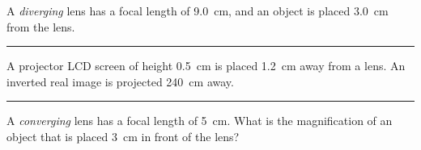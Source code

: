 \documentclass[12pt]{exam}
\begin{document}
\Large


\begin{questions}


\question
  A \emph{diverging} lens has a focal length of 9.0~cm, and an object is placed 3.0~cm from the lens.


\vs \hrule \vs



\question
  A projector LCD screen of height 0.5~cm is placed 1.2~cm away from a lens.  An inverted real image is projected 240~cm away.  



\vs \hrule \vs


\question
  A \emph{converging} lens has a focal length of 5~cm.  What is the magnification of an object that is placed 3~cm in front of the lens?


\end{questions}
\end{document}
